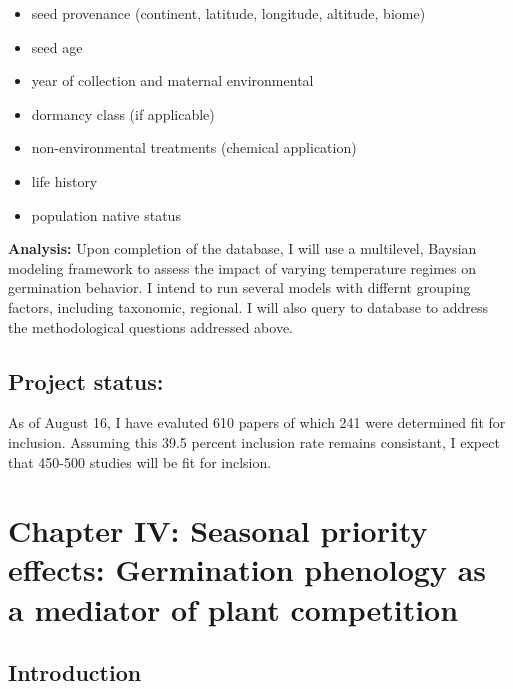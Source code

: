 \documentclass{article}\usepackage[]{graphicx}\usepackage[]{color}
\begin{document}
\begin{itemize}
\item seed provenance (continent, latitude, longitude, altitude, biome)
\item seed age
\item year of collection and maternal environmental
\item dormancy class (if applicable)
\item non-environmental treatments (chemical application)
\item life history
\item population native status
\end{itemize}
\textbf{Analysis:} Upon completion of the database, I will use a multilevel, Baysian modeling framework to assess the impact of varying temperature regimes on germination behavior. I intend to run several models with differnt grouping factors, including taxonomic, regional. I will also query to database to address the methodological questions addressed above.
\subsection*{Project status:}
As of August 16, I have evaluted 610 papers of which 241 were determined fit for inclusion. Assuming this 39.5 percent inclusion rate remains consistant, I expect that 450-500 studies will be fit for inclsion.
\section*{Chapter IV: Seasonal priority effects: Germination phenology as a mediator of plant competition}
\subsection*{Introduction}
\end{document}
